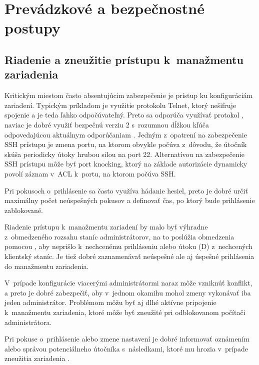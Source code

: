 \section{Prevádzkové a bezpečnostné postupy}

\subsection{Riadenie a zneužitie prístupu k~manažmentu zariadenia}
Kritickým miestom často absentujúcim zabezpečenie je prístup ku konfiguráciám zariadení. Typickým príkladom je využitie protokolu Telnet, ktorý nešifruje spojenie a je teda ľahko odpočúvateľný. Preto sa odporúča využívať protokol , naviac je dobré využiť bezpečnú verziu 2 s~rozumnou dĺžkou kľúča odpovedajúcou aktuálnym odporúčaniam \cite{CIS_DrTLsgXv24lxeIIM}\cite{Barker2019}. Jedným z~opatrení na zabezpečenie SSH prístupu je zmena portu, na ktorom obvykle počúva z~dôvodu, že útočník skúša periodicky útoky hrubou silou na  port 22. Alternatívou na zabezpečenie SSH prístupu môže byť port knocking, ktorý na základe autorizácie dynamicky povolí záznam v~ACL k~portu, na ktorom počúva SSH.

Pri pokusoch o~prihlásenie sa často využíva hádanie hesiel, preto je dobré určiť maximálny počet neúspešných pokusov a definovať čas, po ktorý bude prihlásenie zablokované.

Riadenie prístupu k~manažmentu zariadení by malo byť výhradne z~obmedzeného rozsahu staníc administrátorov, na to poslúžia obmedzenia pomocou , aby neprišlo k~nechcenému prihláseniu alebo útoku (D) z~nechcených klientský staníc. Je tiež dobré zaznamenávať neúspešné ale aj úspešné prihlásenia do manažmentu zariadenia. 

V~prípade konfigurácie viacerými administrátormi naraz môže vzniknúť konflikt, a preto je dobré zabezpečiť, aby v~jednom okamihu mohol zmeny vykonávať iba jeden administrátor. Problémom môžu byť aj dlhé aktívne pripojenie k~manažmentu zariadenia, ktoré môže byť zneužité pri odblokovanom počítači administrátora. 

Pri pokuse o~prihlásenie alebo zmene nastavení je dobré informovať oznámením alebo správou potenciálneho útočníka s~následkami, ktoré mu hrozia v~prípade zneužitia zariadenia \cite{CIS_DrTLsgXv24lxeIIM}. 

